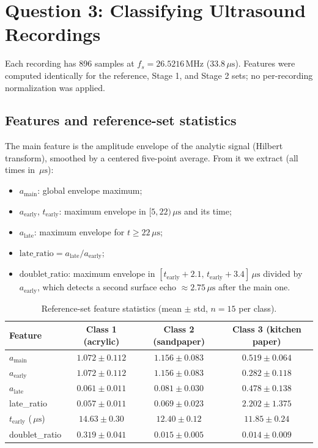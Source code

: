 \documentclass[11pt]{article}
\newcommand{\us}{\ensuremath{\,\mu\mathrm{s}}}
\newcommand{\MHz}{\ensuremath{\,\mathrm{MHz}}}
\begin{document}
\section{Question 3: Classifying Ultrasound Recordings}

Each recording has 896 samples at $f_s=26.5216\MHz$ ($33.8\us$). Features were
computed identically for the reference, Stage 1, and Stage 2 sets; no
per-recording normalization was applied.

\subsection*{Features and reference-set statistics}

The main feature is the amplitude envelope of the analytic signal
(Hilbert transform), smoothed by a centered five-point average. From it we
extract (all times in $\us$):

\begin{itemize}[leftmargin=1.4em]
  \item $a_{\text{main}}$: global envelope maximum;
  \item $a_{\text{early}}$, $t_{\text{early}}$: maximum envelope in
  $[5,22)\us$ and its time;
  \item $a_{\text{late}}$: maximum envelope for $t\ge22\us$;
  \item $\text{late\_ratio}=a_{\text{late}}/a_{\text{early}}$;
  \item $\text{doublet\_ratio}$: maximum envelope in
  $[t_{\text{early}}+2.1,\,t_{\text{early}}+3.4]\us$ divided by
  $a_{\text{early}}$, which detects a second surface echo $\approx2.75\us$
  after the main one.
\end{itemize}

\begin{table}[htbp]
  \centering
  \caption{Reference-set feature statistics (mean $\pm$ std, $n=15$ per class).}
  \begin{tabular}{lccc}
    \toprule
    Feature & Class 1 (acrylic) & Class 2 (sandpaper) & Class 3 (kitchen paper)\\
    \midrule
    $a_{\text{main}}$      & $1.072\pm0.112$ & $1.156\pm0.083$ & $0.519\pm0.064$\\
    $a_{\text{early}}$     & $1.072\pm0.112$ & $1.156\pm0.083$ & $0.282\pm0.118$\\
    $a_{\text{late}}$      & $0.061\pm0.011$ & $0.081\pm0.030$ & $0.478\pm0.138$\\
    late\_ratio            & $0.057\pm0.011$ & $0.069\pm0.023$ & $2.202\pm1.375$\\
    $t_{\text{early}}$ ($\us$) & $14.63\pm0.30$ & $12.40\pm0.12$ & $11.85\pm0.24$\\
    doublet\_ratio         & $0.319\pm0.041$ & $0.015\pm0.005$ & $0.014\pm0.009$\\
    \bottomrule
  \end{tabular}
  \label{tab:q3stats}
\end{table}
\end{document}
